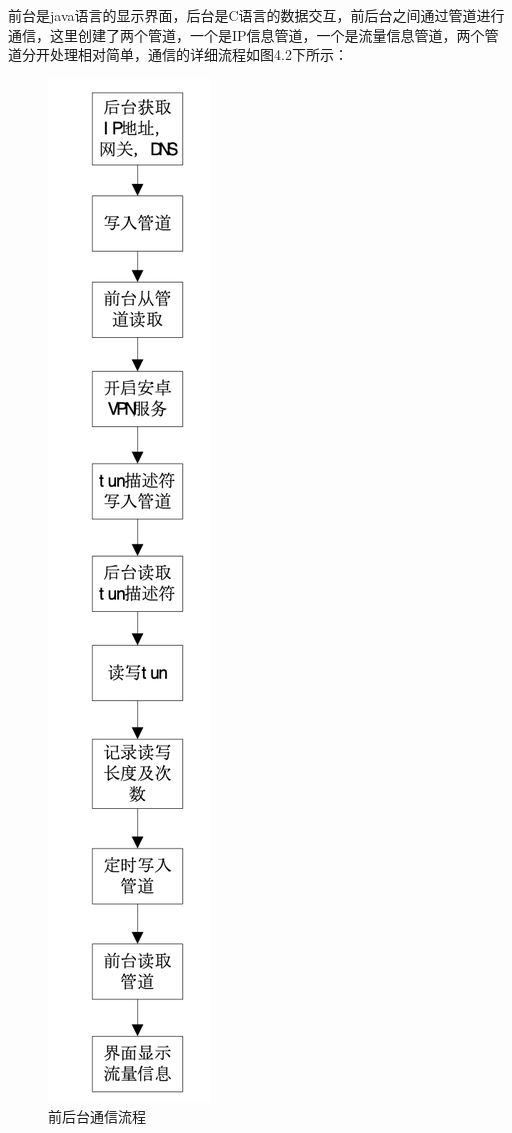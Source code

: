 前台是java语言的显示界面，后台是C语言的数据交互，前后台之间通过管道进行通信，这里创建了两个管道，一个是IP信息管道，一个是流量信息管道，两个管道分开处理相对简单，通信的详细流程如图4.2下所示：
\begin{figure}[!ht]
	\begin{center}
	\includegraphics[scale=.58]{front_back.png}
	\end{center}
	\caption{前后台通信流程}
	\label{figure:前后台通信流程图}
\end{figure}

